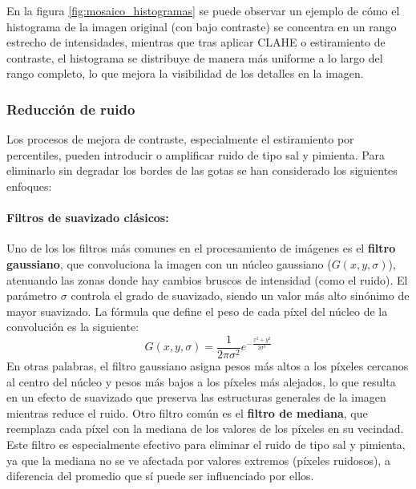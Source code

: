 En la figura \ref{fig:mosaico_histogramas} se puede observar un ejemplo de cómo el histograma de la imagen original (con bajo contraste) se concentra en un rango estrecho de intensidades, mientras que tras aplicar CLAHE o estiramiento de contraste, el histograma se distribuye de manera más uniforme a lo largo del rango completo, lo que mejora la visibilidad de los detalles en la imagen.

\subsubsection{Reducción de ruido}

Los procesos de mejora de contraste, especialmente el estiramiento por percentiles, pueden introducir o amplificar ruido de tipo sal y pimienta. Para eliminarlo sin degradar los bordes de las gotas se han considerado los siguientes enfoques:

\paragraph{Filtros de suavizado clásicos:} Uno de los los filtros más comunes en el procesamiento de imágenes es el \textbf{filtro gaussiano}, que convoluciona la imagen con un núcleo gaussiano ($G(x,y,\sigma)$), atenuando las zonas donde hay cambios bruscos de intensidad (como el ruido). El parámetro $\sigma$ controla el grado de suavizado, siendo un valor más alto sinónimo de mayor suavizado. La fórmula que define el peso de cada píxel del núcleo de la convolución es la siguiente:
\begin{equation}
G(x,y,\sigma) = \frac{1}{2\pi\sigma^2} e^{-\frac{x^2 + y^2}{2\sigma^2}}
\end{equation}
En otras palabras, el filtro gaussiano asigna pesos más altos a los píxeles cercanos al centro del núcleo y pesos más bajos a los píxeles más alejados, lo que resulta en un efecto de suavizado que preserva las estructuras generales de la imagen mientras reduce el ruido.
Otro filtro común es el \textbf{filtro de mediana}, que reemplaza cada píxel con la mediana de los valores de los píxeles en su vecindad. Este filtro es especialmente efectivo para eliminar el ruido de tipo sal y pimienta, ya que la mediana no se ve afectada por valores extremos (píxeles ruidosos), a diferencia del promedio que sí puede ser influenciado por ellos.

